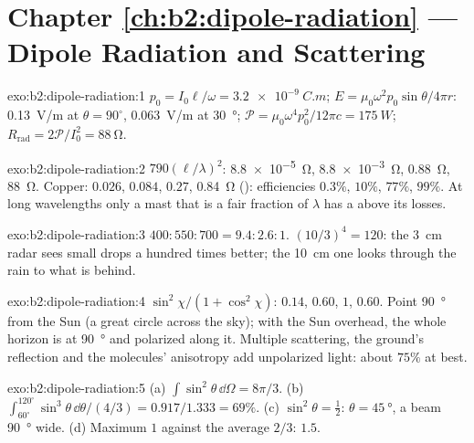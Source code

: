 \section*{Chapter \ref{ch:b2:dipole-radiation} --- Dipole Radiation and Scattering}

\begin{solution}{exo:b2:dipole-radiation:1}
$p_0 = I_0\ell/\omega = \qty{3.2e-9}{C.m}$; $E = \mu_0\omega^2p_0\sin\theta/4\pi r$: \qty{0.13}{V/m}
at $\theta = 90^\circ$, \qty{0.063}{V/m} at \qty{30}{\degree}; $\mathcal P = \mu_0\omega^4p_0^2/12\pi c =
\qty{175}{W}$; $R_{\text{rad}} = 2\mathcal P/I_0^2 = \qty{88}{\ohm}$.
\end{solution}

\begin{solution}{exo:b2:dipole-radiation:2}
$790(\ell/\lambda)^2$: \qty{8.8e-5}{\ohm}, \qty{8.8e-3}{\ohm}, \qty{0.88}{\ohm}, \qty{88}{\ohm}. Copper:
$0.026$, $0.084$, $0.27$, \qty{0.84}{\ohm} (): efficiencies $0.3\%$, $10\%$,
$77\%$, $99\%$. At long wavelengths only a mast that is a fair fraction of
$\lambda$ has a  above its losses.
\end{solution}

\begin{solution}{exo:b2:dipole-radiation:3}
$400 : 550 : 700 = 9.4 : 2.6 : 1$. $(10/3)^4 = 120$: the \qty{3}{cm} radar
sees small drops a hundred times better; the \qty{10}{cm} one looks
through the rain to what is behind.
\end{solution}

\begin{solution}{exo:b2:dipole-radiation:4}
$\sin^2\chi/(1 + \cos^2\chi)$: $0.14$, $0.60$, $1$, $0.60$. Point \qty{90}{\degree} from the
Sun (a great circle across the sky); with the Sun overhead, the whole
horizon is at \qty{90}{\degree} and polarized along it. Multiple scattering,
the ground's reflection and the molecules' anisotropy add unpolarized
light: about $75\%$ at best.
\end{solution}

\begin{solution}{exo:b2:dipole-radiation:5}
(a) $\int\sin^2\theta\,\dd\Omega = 8\pi/3$. (b) $\int_{60^\circ}^{120^\circ}\sin^3\theta\,\dd\theta/
(4/3) = 0.917/1.333 = 69\%$. (c) $\sin^2\theta = \tfrac12$: $\theta = \qty{45}{\degree}$, a
beam \qty{90}{\degree} wide. (d) Maximum $1$ against the average $2/3$: $1.5$.
\end{solution}

